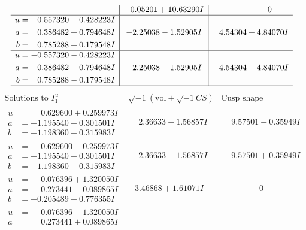 \documentclass[1p]{elsarticle_modified}
\theoremstyle{definition}
\newcommand{\I}{\sqrt{-1}}
\begin{document}
$$\begin{array}{c|c|c}
 & \phantom{-}0.05201 + 10.63290 I & \phantom{-0.000000 } 0 \\ \hline\begin{aligned}
u &= -0.557320 + 0.428223 I \\
a &= \phantom{-}0.386482 + 0.794648 I \\
b &= \phantom{-}0.785288 + 0.179548 I\end{aligned}
 & -2.25038 - 1.52905 I & \phantom{-}4.54304 + 4.84070 I \\ \hline\begin{aligned}
u &= -0.557320 - 0.428223 I \\
a &= \phantom{-}0.386482 - 0.794648 I \\
b &= \phantom{-}0.785288 - 0.179548 I\end{aligned}
 & -2.25038 + 1.52905 I & \phantom{-}4.54304 - 4.84070 I\\
 \hline 
 \end{array}$$\newpage$$\begin{array}{c|c|c}  
\text{Solutions to }I^u_{1}& \I (\text{vol} + \sqrt{-1}CS) & \text{Cusp shape}\\
 \hline 
\begin{aligned}
u &= \phantom{-}0.629600 + 0.259973 I \\
a &= -1.195540 - 0.301501 I \\
b &= -1.198360 + 0.315983 I\end{aligned}
 & \phantom{-}2.36633 - 1.56857 I & \phantom{-}9.57501 - 0.35949 I \\ \hline\begin{aligned}
u &= \phantom{-}0.629600 - 0.259973 I \\
a &= -1.195540 + 0.301501 I \\
b &= -1.198360 - 0.315983 I\end{aligned}
 & \phantom{-}2.36633 + 1.56857 I & \phantom{-}9.57501 + 0.35949 I \\ \hline\begin{aligned}
u &= \phantom{-}0.076396 + 1.320050 I \\
a &= \phantom{-}0.273441 - 0.089865 I \\
b &= -0.205489 - 0.776355 I\end{aligned}
 & -3.46868 + 1.61071 I & \phantom{-0.000000 } 0 \\ \hline\begin{aligned}
u &= \phantom{-}0.076396 - 1.320050 I \\
a &= \phantom{-}0.273441 + 0.089865 I \\

\end{aligned}
\end{array}$$
\end{document}
